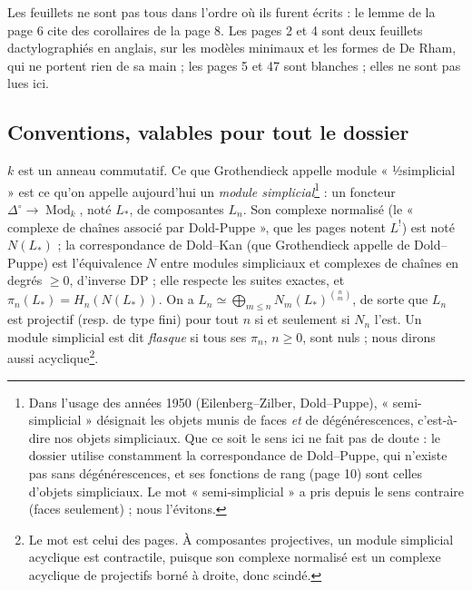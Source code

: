 \documentclass[11pt,a4paper]{article}
\begin{document}
Les feuillets ne sont pas tous dans l'ordre où ils furent écrits : le lemme
de la page 6 cite des corollaires de la page 8. Les pages 2 et 4 sont deux
feuillets dactylographiés en anglais, sur les modèles minimaux et les formes
de De Rham, qui ne portent rien de sa main ; les pages 5 et 47 sont
blanches ; elles ne sont pas lues ici.

\subsection*{Conventions, valables pour tout le dossier}

$k$ est un anneau commutatif. Ce que Grothendieck appelle module
« ½simplicial » est ce qu'on appelle aujourd'hui un \emph{module
simplicial}\footnote{Dans l'usage des années 1950 (Eilenberg–Zilber,
Dold–Puppe), « semi-simplicial » désignait les objets munis de faces
\emph{et} de dégénérescences, c'est-à-dire nos objets simpliciaux. Que ce
soit le sens ici ne fait pas de doute : le dossier utilise constamment la
correspondance de Dold–Puppe, qui n'existe pas sans dégénérescences, et ses
fonctions de rang (page 10) sont celles d'objets simpliciaux. Le mot « semi-simplicial » a pris depuis le sens contraire (faces seulement) ; nous
l'évitons.} : un foncteur $\Delta^{\circ} \to \operatorname{Mod}_{k}$, noté
$L_{*}$, de composantes $L_{n}$. Son complexe normalisé (le « complexe de
chaînes associé par Dold-Puppe », que les pages notent $L^{!}$) est noté
$N(L_{*})$ ; la correspondance de Dold–Kan (que Grothendieck appelle de
Dold–Puppe) est l'équivalence $N$ entre modules simpliciaux et complexes de
chaînes en degrés $\geqslant 0$, d'inverse $\mathrm{DP}$ ; elle respecte les
suites exactes, et $\pi_{n}(L_{*}) = H_{n}(N(L_{*}))$. On a
$L_{n} \simeq \bigoplus_{m \leqslant n} N_{m}(L_{*})^{\binom{n}{m}}$, de
sorte que $L_{n}$ est projectif (resp. de type fini) pour tout $n$ si et
seulement si $N_{n}$ l'est. Un module simplicial est dit \emph{flasque} si
tous ses $\pi_{n}$, $n \geqslant 0$, sont nuls ; nous dirons aussi
acyclique\footnote{Le mot est celui des pages. À composantes projectives,
un module simplicial acyclique est contractile, puisque son complexe
normalisé est un complexe acyclique de projectifs borné à droite, donc
scindé.}.
\end{document}
